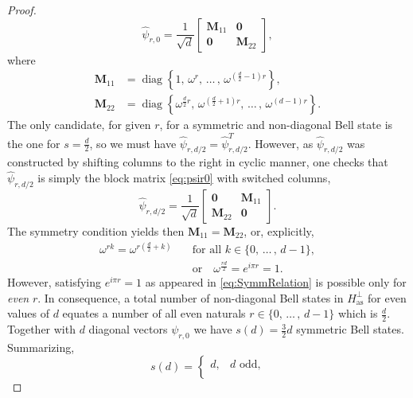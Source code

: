 \documentclass[10pt,a4paper]{amsart}
\newcommand\diag{\operatorname{diag}}
\newcommand{\aspace}{H_{\mathrm{as}}}
\begin{document}
\begin{proof}
\begin{equation}\label{eq:psir0}
    \hat{\psi}_{r,0} = \frac{1}{\sqrt{d}} \left[ \begin{array}{c|c} \mathbf{M}_{11} & \mathbf{0} \\ \hline \mathbf{0} & \mathbf{M}_{22} \end{array} \right],
\end{equation}
where
\begin{align}
    \mathbf{M}_{11} &= \diag\left\{1,\, \omega^{r}, \, \ldots \, , \, \omega^{\left( \frac{d}{2}-1\right) r}\right\},\\
    \mathbf{M}_{22} &= \diag\left\{\omega^{\frac{d}{2}r},\, \omega^{\left( \frac{d}{2}+1\right) r}, \, \ldots \, , \, \omega^{(d-1) r}\right\}.\nonumber
\end{align}
The only candidate, for given $r$, for a symmetric and non-diagonal Bell state is the one for $s = \frac{d}{2}$, so we must have $\hat{\psi}_{r,d/2} = \hat{\psi}_{r,d/2}^{T}$. However, as $\hat{\psi}_{r,d/2}$ was constructed by shifting columns to the right in cyclic manner, one checks that $\hat{\psi}_{r,d/2}$ is simply the block matrix \eqref{eq:psir0} with switched columns,
\begin{equation}
    \hat{\psi}_{r,d/2} = \frac{1}{\sqrt{d}} \left[ \begin{array}{c|c} \mathbf{0} & \mathbf{M}_{11} \\ \hline \mathbf{M}_{22} & \mathbf{0} \end{array} \right].
\end{equation}
The symmetry condition yields then $\mathbf{M}_{11} = \mathbf{M}_{22}$, or, explicitly,
\begin{align}\label{eq:SymmRelation}
    \omega^{rk} = \omega^{r\left(\frac{d}{2} + k\right)} \quad &\text{for all } k \in \{0,\, \ldots \, , \, d-1\},\\
    &\text{or} \quad \omega^{\frac{rd}{2}} = e^{i\pi r} = 1.\nonumber
\end{align}
However, satisfying $e^{i\pi r} = 1$ as appeared in \eqref{eq:SymmRelation} is possible only for \emph{even} $r$. In consequence, a total number of non-diagonal Bell states in $\aspace^{\perp}$ for even values of $d$ equates a number of all even naturals $r \in \{0, \, \ldots \, , \, d-1\}$ which is $\frac{d}{2}$. Together with $d$ diagonal vectors $\psi_{r,0}$ we have $s(d) = \frac{3}{2}d$ symmetric Bell states. Summarizing,
\begin{equation}
    s(d) = \begin{cases}
        d, & d \text{ odd,} \\

\end{cases}
\end{equation}
\end{proof}
\end{document}
